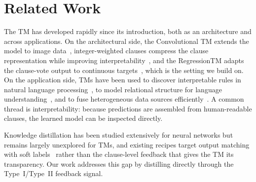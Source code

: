 \section{Related Work}
\label{sec:related}

The TM has developed rapidly since its introduction, both as an architecture and across
applications. On the architectural side, the Convolutional TM extends the model to image
data~\cite{granmo2019convtm}, integer-weighted clauses compress the clause representation
while improving interpretability~\cite{abeyrathna2021integer}, and the RegressionTM adapts
the clause-vote output to continuous targets~\cite{abeyrathna2020regression}, which is the
setting we build on. On the application side, TMs have been used to discover interpretable
rules in natural language processing~\cite{saha2023nlprules}, to model relational structure
for language understanding~\cite{saha2022relational}, and to fuse heterogeneous data sources
efficiently~\cite{saha2023datafusion}. A common thread is interpretability: because
predictions are assembled from human-readable clauses, the learned model can be inspected
directly.

Knowledge distillation has been studied extensively for neural networks but remains largely
unexplored for TMs, and existing recipes target output matching with soft
labels~\cite{hinton2015distilling} rather than the clause-level feedback that gives the TM
its transparency. Our work addresses this gap by distilling directly through the
Type~I/Type~II feedback signal.
